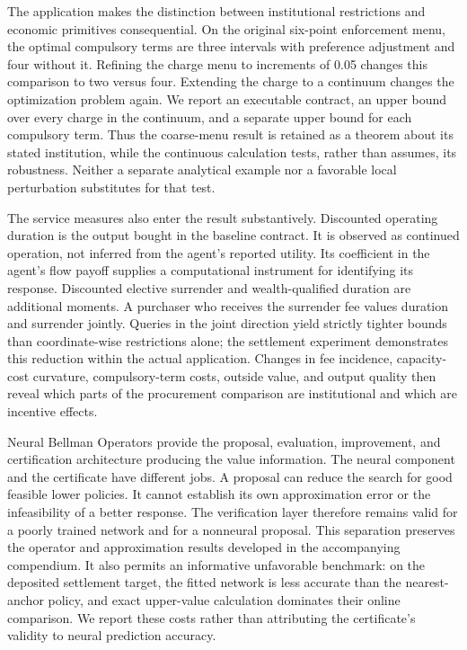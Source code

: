 The application makes the distinction between institutional restrictions and economic primitives consequential. On the original six-point enforcement menu, the optimal compulsory terms are three intervals with preference adjustment and four without it. Refining the charge menu to increments of 0.05 changes this comparison to two versus four. Extending the charge to a continuum changes the optimization problem again. We report an executable contract, an upper bound over every charge in the continuum, and a separate upper bound for each compulsory term. Thus the coarse-menu result is retained as a theorem about its stated institution, while the continuous calculation tests, rather than assumes, its robustness. Neither a separate analytical example nor a favorable local perturbation substitutes for that test.

The service measures also enter the result substantively. Discounted operating duration is the output bought in the baseline contract. It is observed as continued operation, not inferred from the agent's reported utility. Its coefficient in the agent's flow payoff supplies a computational instrument for identifying its response. Discounted elective surrender and wealth-qualified duration are additional moments. A purchaser who receives the surrender fee values duration and surrender jointly. Queries in the joint direction yield strictly tighter bounds than coordinate-wise restrictions alone; the settlement experiment demonstrates this reduction within the actual application. Changes in fee incidence, capacity-cost curvature, compulsory-term costs, outside value, and output quality then reveal which parts of the procurement comparison are institutional and which are incentive effects.

Neural Bellman Operators provide the proposal, evaluation, improvement, and certification architecture producing the value information. The neural component and the certificate have different jobs. A proposal can reduce the search for good feasible lower policies. It cannot establish its own approximation error or the infeasibility of a better response. The verification layer therefore remains valid for a poorly trained network and for a nonneural proposal. This separation preserves the operator and approximation results developed in the accompanying compendium. It also permits an informative unfavorable benchmark: on the deposited settlement target, the fitted network is less accurate than the nearest-anchor policy, and exact upper-value calculation dominates their online comparison. We report these costs rather than attributing the certificate's validity to neural prediction accuracy.

